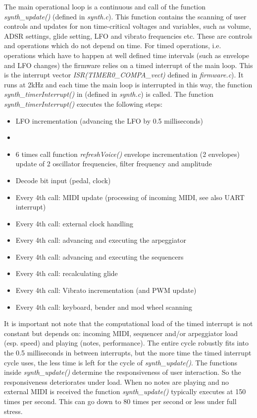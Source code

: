 \documentclass[portrait, 11pt, oneside]{report}
\begin{document}
The main operational loop is a continuous and call of the function \textit{synth\_update()} (defined in \textit{synth.c}). This function contains the scanning of user controls and updates for non time-critical voltages and variables, such as volume, ADSR settings, glide setting, LFO and vibrato frequencies etc. These are controls and operations which do not depend on time. For timed operations, i.e. operations which have to happen at well defined time intervals (such as envelope and LFO changes) the firmware relies on a timed interrupt of the main loop. This is the interrupt vector \textit{ISR(TIMER0\_COMPA\_vect)} defined in \textit{firmware.c}). It runs at 2kHz and each time the main loop is interrupted in this way, the function \textit{synth\_timerInterrupt()} in (defined in \textit{synth.c}) is called. The function \textit{synth\_timerInterrupt()} executes the following steps:

\begin{itemize}
  \item LFO incrementation (advancing the LFO by 0.5 milliseconds) 
  \item 
  \item 6 times call function \textit{refreshVoice()}
  \subitem envelope incrementation (2 envelopes) 
  \subitem update of 2 oscillator frequencies, filter frequency and amplitude 
  \item Decode bit input (pedal, clock)
  \item Every 4th call: MIDI update (processing of incoming MIDI, see also UART interrupt)
  \item Every 4th call: external clock handling
  \item Every 4th call: advancing and executing the arpeggiator
  \item Every 4th call: advancing and executing the sequencers
  \item Every 4th call: recalculating glide 
  \item Every 4th call: Vibrato incrementation (and PWM update)
  \item Every 4th call: keyboard, bender and mod wheel scanning  
\end{itemize}

It is important not note that the computational load of the timed interrupt is not constant but depends on: incoming MIDI, sequencer and/or arpeggiator load (esp. speed) and playing (notes, performance). The entire cycle robustly fits into the 0.5 milliseconds in between interrupts, but the more time the timed interrupt cycle uses, the less time is left for the cycle of \textit{synth\_update()}. The functions inside \textit{synth\_update()} determine the responsiveness of user interaction. So the responsiveness deteriorates under load. When no notes are playing and no external MIDI is received the function \textit{synth\_update()} typically executes at 150 times per second. This can go down to 80 times per second or less under full stress.
\end{document}

